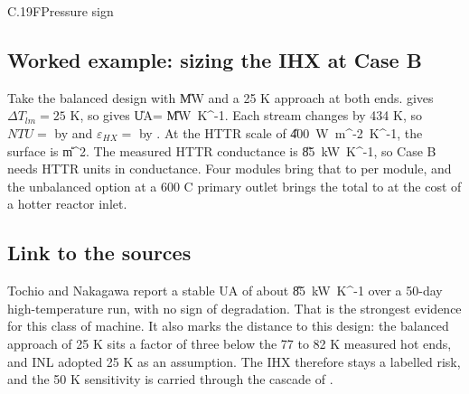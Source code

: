 \begin{eqcard}{C.19}{F}{Pressure sign}
\end{eqcard}

\subsection*{Worked example: sizing the IHX at Case B}
Take the balanced design with \vQprocxB{} \U{MW} and a 25 K approach at both ends.  gives $\Delta T_{lm}=25$ K, so  gives \U{UA=}\cUAb{} \U{MW\ K^{-1}}. Each stream changes by 434 K, so $NTU=$ \cNTUb{} by  and $\varepsilon_{HX}=$ \cEpsb{} by . At the HTTR scale of \U{400\ W\ m^{-2}\ K^{-1}}, the surface is \cAreab{} \U{m^2}. The measured HTTR conductance is \U{85\ kW\ K^{-1}}, so Case B needs \cUAratio{} HTTR units in conductance. Four modules bring that to \cUAmoduleRatio{} per module, and the unbalanced option at a 600 C primary outlet brings the total to \cImbalRatioB{} at the cost of a hotter reactor inlet.

\subsection*{Link to the sources}
Tochio and Nakagawa report a stable UA of about \U{85\ kW\ K^{-1}} over a 50-day high-temperature run, with no sign of degradation. That is the strongest evidence for this class of machine. It also marks the distance to this design: the balanced approach of 25 K sits a factor of three below the 77 to 82 K measured hot ends, and INL adopted 25 K as an assumption. The IHX therefore stays a labelled risk, and the 50 K sensitivity is carried through the cascade of .
